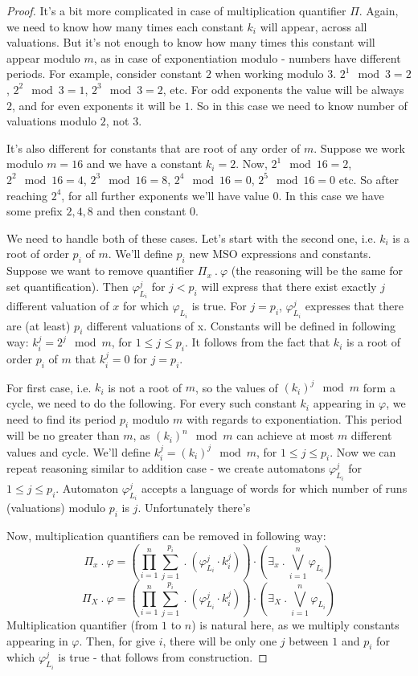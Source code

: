 \documentclass[12pt]{article}
\theoremstyle{definition}
\begin{document}
\begin{proof}
    It's a bit more complicated in case of multiplication quantifier $\Pi$. Again, we need to know how many times each constant $k_i$ will appear, across all valuations. But it's not enough to know how many times this constant will appear modulo $m$, as in case of exponentiation modulo - numbers have different periods. For example, consider constant $2$ when working modulo $3$. $2^1 \mod 3 = 2$, $2^2 \mod 3 = 1$, $2^3 \mod 3 = 2$, etc. For odd exponents the value will be always $2$, and for even exponents it will be $1$. So in this case we need to know number of valuations modulo $2$, not $3$. 

    It's also different for constants that are root of any order of $m$. Suppose we work modulo $m = 16$ and we have a constant $k_i = 2$. Now, $2^1 \mod 16 = 2$, $2^2 \mod 16 = 4$, $2^3 \mod 16 = 8$, $2^4 \mod 16 = 0$, $2^5 \mod 16 = 0$ etc. So after reaching $2^4$, for all further exponents we'll have value $0$. In this case we have some prefix $2,4,8$ and then constant $0$.

    We need to handle both of these cases. Let's start with the second one, i.e. $k_i$ is a root of order $p_i$ of $m$. We'll define $p_i$ new MSO expressions and constants. Suppose we want to remove quantifier $\Pi_x \ . \ \varphi$ (the reasoning will be the same for set quantification). Then $\varphi_{L_i}^j$ for $j < p_i$ will express that there exist exactly $j$ different valuation of $x$ for which $\varphi_{L_i}$ is true. For $j = p_i$, $\varphi_{L_i}^j$ expresses that there are (at least) $p_i$ different valuations of x. Constants will be defined in following way: $k_i^j = 2^j \mod m$, for $1 \leq j \leq p_i$. It follows from the fact that $k_i$ is a root of order $p_i$ of $m$ that $k_i^j = 0$ for $j = p_i$.

    For first case, i.e. $k_i$ is not a root of $m$, so the values of $(k_i)^j \mod m$ form a cycle, we need to do the following. For every such constant $k_i$ appearing in $\varphi$, we need to find its period  $p_i$ modulo $m$ with regards to exponentiation. This period will be no greater than $m$, as $(k_i)^n \mod m$ can achieve at most $m$ different values and cycle. We'll define $k_i^j = (k_i)^j \mod m$, for $1 \leq j \leq p_i$. Now we can repeat reasoning similar to addition case - we create automatons $\varphi_{L_i}^{j}$ for $1 \leq j \leq p_i$. Automaton $\varphi_{L_i}^{j}$ accepts a language of words for which number of runs (valuations) modulo $p_i$ is $j$. Unfortunately there's 
    
    Now, multiplication quantifiers can be removed in following way:
    $$\Pi_x \ . \ \varphi = (\prod_{i = 1}^n \sum_{j = 1}^{p_i} \ . \ (\varphi_{L_i}^j \cdot k_i^j)) \cdot (\exists_x \ . \ \bigvee_{i = 1}^n \varphi_{L_i})$$
    $$\Pi_X \ . \ \varphi = (\prod_{i = 1}^n \sum_{j = 1}^{p_i} \ . \ (\varphi_{L_i}^j \cdot k_i^j)) \cdot (\exists_X \ . \ \bigvee_{i = 1}^n \varphi_{L_i})$$
    Multiplication quantifier (from $1$ to $n$) is natural here, as we multiply constants appearing in $\varphi$. Then, for give $i$, there will be only one $j$ between $1$ and $p_i$ for which $\varphi_{L_i}^j$ is true - that follows from construction.
\end{proof}
\end{document}

